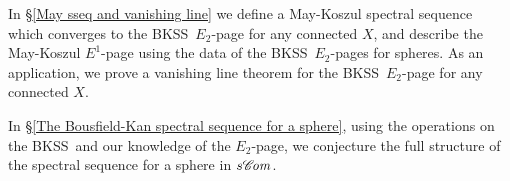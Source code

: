 \documentclass[11pt]{amsart} \renewcommand{\baselinestretch}{1.2}
\theoremstyle{plain}
\numberwithin{equation}{section} %
\theoremstyle{plain}
\numberwithin{equation}{chapter} %
\newcommand{\scrC}{\mathscr{C}}
\newcommand{\algs}{{\scrC\!\textit{\normalfont\textit{om}}}}
\newcommand{\BKSS}{BKSS}
\begin{document}
\begin{Introduction}
In \S\ref{May sseq and vanishing line} we define a May-Koszul spectral sequence which converges to the \BKSS\ $E_2$-page for any connected $X$, and describe the May-Koszul $E^1$-page using the data of the \BKSS\ $E_2$-pages for spheres. As an application, we prove a vanishing line theorem for the \BKSS\ $E_2$-page for any connected $X$.


In \S\ref{The Bousfield-Kan spectral sequence for a sphere}, using the operations on the \BKSS\ and our knowledge of the $E_2$-page, we conjecture the full structure of the spectral sequence for a sphere in $s\algs$.

%


\end{Introduction}
\end{document}
